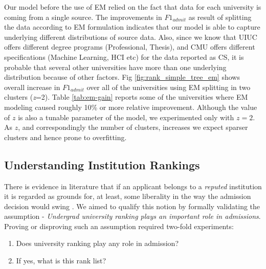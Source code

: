 \documentclass{sig-alternate-05-2015}
\begin{document}
Our model before the use of EM relied on the fact that data for each university is coming from a single source. The improvements in $F1_{admit}$ as result of splitting the data according to EM formulation indicates that our model is able to capture underlying different distributions of source data. Also, since we know that UIUC offers different degree programs (Professional, Thesis), and CMU offers different specifications (Machine Learning, HCI etc) for the data reported as CS, it is probable that several other universities have more than one underlying distribution because of other factors. Fig \ref{fig:rank_simple_tree_em} shows overall increase in $F1_{admit}$ over all of the universities using EM splitting in two clusters (\textit{z}=2). Table \ref{tab:em-gain} reports some of the universities where EM modeling caused roughly 10\% or more relative improvement. Although the value of $z$ is also a tunable parameter of the model, we experimented only with $z=2$. As $z$, and correspondingly the number of clusters, increases we expect sparser clusters and hence prone to overfitting.


\subsection{Understanding Institution Rankings}
\label{subsec:ranking-exp}
There is evidence in literature that if an applicant belongs to a \textit{reputed} institution it is regarded as grounds for, at least, some liberality in the way the admission decision would swing \cite{dagap}. We aimed to qualify this notion by formally validating the assumption - \textit{Undergrad university ranking plays an important role in admissions}. Proving or disproving such an assumption required two-fold experiments:
\begin{enumerate}
\item Does university ranking play any role in admission?
\item If yes, what is this rank list?
\end{enumerate}
\end{document}
